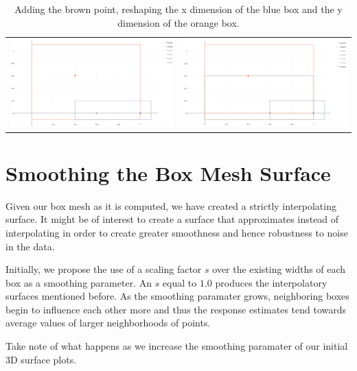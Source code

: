 \documentclass[11pt,margin=1in]{article}
\begin{document}
\begin{table}[!htbp]
  \centering
  \begin{tabular}{cc}
    \includegraphics[width=7.5cm]{3-Before} & \includegraphics[width=7.5cm]{3-After} \\
  \end{tabular}
  \caption{Adding the brown point, reshaping the x dimension of the
    blue box and the y dimension of the orange box.}
\end{table}


\section{Smoothing the Box Mesh Surface}

Given our box mesh as it is computed, we have created a strictly
interpolating surface. It might be of interest to create a surface
that approximates instead of interpolating in order to create greater
smoothness and hence robustness to noise in the data.

Initially, we propose the use of a scaling factor $s$ over the
existing widths of each box as a smoothing parameter. An $s$ equal to
$1.0$ produces the interpolatory surfaces mentioned before. As the
smoothing paramater grows, neighboring boxes begin to influence each
other more and thus the response estimates tend towards average values
of larger neighborhoods of points.

Take note of what happens as we increase the smoothing paramater of
our initial 3D surface plots.
\end{document}
